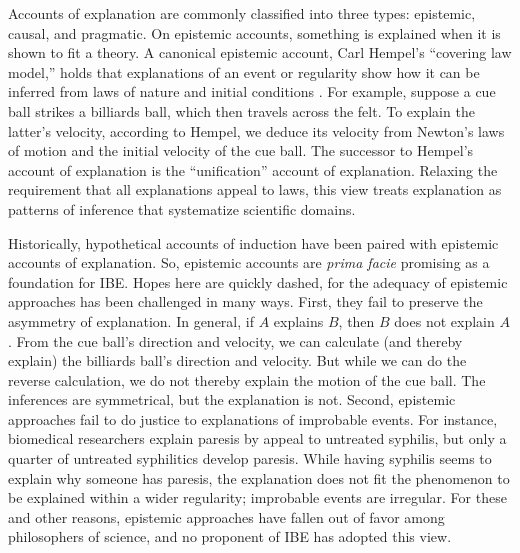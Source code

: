 \documentclass{article}[11pt]
\begin{document}
Accounts of explanation are commonly classified into three types: epistemic, causal, and pragmatic.  On epistemic accounts, something is explained when it is shown to fit a theory. A canonical epistemic account, Carl Hempel's ``covering law model,'' holds that explanations of an event or regularity show how it can be inferred from laws of nature and initial conditions \citep{Hempel1965}.  For example, suppose a cue ball strikes a billiards ball, which then travels across the felt. To explain the latter's velocity, according to Hempel, we deduce its velocity from Newton's laws of motion and the initial velocity of the cue ball.  The successor to Hempel's account of explanation is the ``unification'' account of explanation.  Relaxing the requirement that all explanations appeal to laws, this view treats explanation as patterns of inference that systematize scientific domains.

Historically, hypothetical accounts of induction have been paired with epistemic accounts of explanation. So, epistemic accounts are \textit{prima facie} promising as a foundation for IBE.  Hopes here are quickly dashed, for the adequacy of epistemic approaches has been challenged in many ways. First, they fail to preserve the asymmetry of explanation. In general, if $A$ explains $B$, then $B$ does not explain $A$.  From the cue ball's direction and velocity, we can calculate (and thereby explain) the billiards ball's direction and velocity.  But while we can do the reverse calculation, we do not thereby explain the motion of the cue ball.  The inferences are symmetrical, but the explanation is not.  Second, epistemic approaches fail to do justice to explanations of improbable events. For instance, biomedical researchers explain paresis by appeal to untreated syphilis, but only a quarter of untreated syphilitics develop paresis.  While having syphilis seems to explain why someone has paresis, the explanation does not fit the phenomenon to be explained within a wider regularity; improbable events are irregular.  For these and other reasons, epistemic approaches have fallen out of favor among philosophers of science, and no proponent of IBE has adopted this view.
\end{document}
